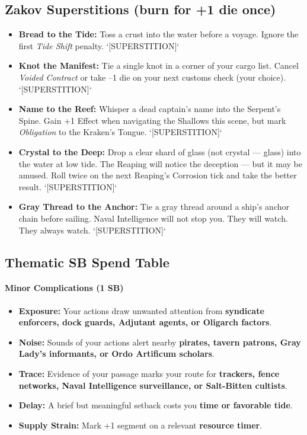 \subsection*{Zakov Superstitions (burn for +1 die once)}
\begin{itemize}
  \item \textbf{Bread to the Tide:} Toss a crust into the water before a voyage. Ignore the first \emph{Tide Shift} penalty. `[SUPERSTITION]`
  \item \textbf{Knot the Manifest:} Tie a single knot in a corner of your cargo list. Cancel \emph{Voided Contract} or take --1 die on your next customs check (your choice). `[SUPERSTITION]`
  \item \textbf{Name to the Reef:} Whisper a dead captain's name into the Serpent's Spine. Gain +1 Effect when navigating the Shallows this scene, but mark \emph{Obligation} to the Kraken's Tongue. `[SUPERSTITION]`
  \item \textbf{Crystal to the Deep:} Drop a clear shard of glass (not crystal --- glass) into the water at low tide. The Reaping will notice the deception --- but it may be amused. Roll twice on the next Reaping's Corrosion tick and take the better result. `[SUPERSTITION]`
  \item \textbf{Gray Thread to the Anchor:} Tie a gray thread around a ship's anchor chain before sailing. Naval Intelligence will not stop you. They will watch. They always watch. `[SUPERSTITION]`
\end{itemize}

\subsection*{Thematic SB Spend Table}
\label{sec:zakov-sb}

\paragraph{Minor Complications (1 SB)}
\begin{itemize}
\item \textbf{Exposure:} Your actions draw unwanted attention from \textbf{syndicate enforcers, dock guards, Adjutant agents, or Oligarch factors}.
\item \textbf{Noise:} Sounds of your actions alert nearby \textbf{pirates, tavern patrons, Gray Lady's informants, or Ordo Artificum scholars}.
\item \textbf{Trace:} Evidence of your passage marks your route for \textbf{trackers, fence networks, Naval Intelligence surveillance, or Salt-Bitten cultists}.
\item \textbf{Delay:} A brief but meaningful setback costs you \textbf{time or favorable tide}.
\item \textbf{Supply Strain:} Mark +1 segment on a relevant \textbf{resource timer}.
\end{itemize}

